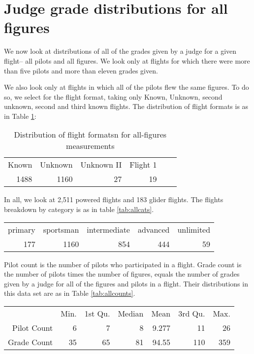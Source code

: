 \section{Judge grade distributions for all figures}

We now look at distributions of all of the grades given by a judge for
a given flight-- all pilots and all figures. We look only at flights for
which there were more than five pilots and more than eleven grades given.

We also look only at flights in which all of the pilots flew the same figures.
To do so, we select for the flight format, taking only Known, Unknown, second
unknown, second and third known flights. The distribution of flight formats is
as in Table \ref{tab:allformat}:

\begin{table}[tbp]
  \centering
  \begin{tabular}{r r r r r r}
  Known & Unknown & Unknown II & Flight 1 \\
  1488 & 1160 & 27 & 19 \\
  \end{tabular}
  \caption{Distribution of flight formatsn for all-figures measurements}
  \label{tab:allformat}
\end{table}

In all, we look at 2,511 powered flights and 183 glider flights. The flights
breakdown by category is as in table \ref{tab:allcats}.

\begin{table*}[tbp]
  \begin{tabular}{r r r r r}
  primary  & sportsman & intermediate  &  advanced  & unlimited  \\
      177  &      1160 &          854  &       444  &        59  \\
  \end{tabular}
  \caption{Distribution of categories for all-figures measurements}
  \label{tab:allcats}
\end{table*}

Pilot count is the number of pilots who participated in a flight.
Grade count is the number of pilots times the number of figures, equals
the number of grades given by a judge for all of the figures and pilots in
a flight. Their distributions in this data set are as in
Table \ref{tab:allcounts}.

\begin{table*}[tbp]
  \begin{tabular}{r | r r r r r r}
  & Min. & 1st Qu. & Median & Mean & 3rd Qu. & Max. \\
  Pilot Count &  6 &  7 &  8 & 9.277 &  11 &  26 \\
  Grade Count & 35 & 65 & 81 & 94.55 & 110 & 359 \\
  \end{tabular}
  \caption{Distribution of pilot and grade counts for all-figures measurements}
  \label{tab:allcounts}
\end{table*}

